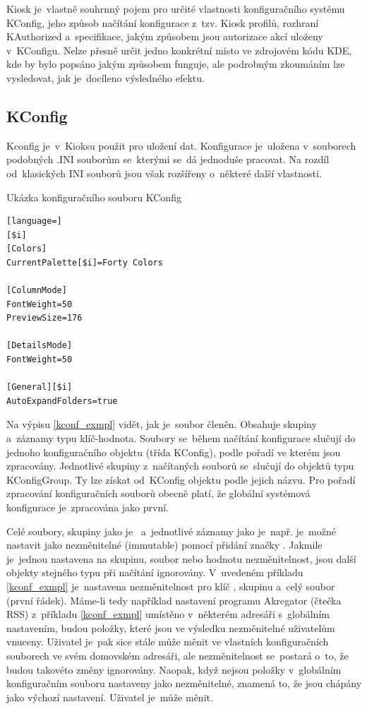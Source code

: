 Kiosk je~vlastně souhrnný pojem pro určité vlastnosti konfiguračního systému KConfig, jeho způsob načítání konfigurace z~tzv. Kiosk profilů, rozhraní KAuthorized a~specifikace, jakým způsobem jsou autorizace akcí uloženy v~KConfigu. Nelze přesně určit jedno konkrétní místo ve zdrojovém kódu KDE, kde by bylo popsáno jakým způsobem funguje, ale podrobným zkoumáním lze vysledovat, jak je~docíleno výsledného efektu.

\subsection*{KConfig}
Kconfig je~v~Kioksu použit pro uložení dat. Konfigurace je~uložena v~souborech podobných .INI souborům se~kterými se~dá jednoduše pracovat. Na rozdíl od~klasických INI souborů jsou však rozšířeny o~některé další vlastnosti.\cite{wikiINIfiles}
\begin{mylisting}
\caption{Ukázka konfiguračního souboru KConfig}
\label{kconf_exmpl}
\begin{lstlisting}[language=]
[$i]
[Colors]
CurrentPalette[$i]=Forty Colors

[ColumnMode]
FontWeight=50
PreviewSize=176

[DetailsMode]
FontWeight=50

[General][$i]
AutoExpandFolders=true
\end{lstlisting}
\end{mylisting}

Na výpisu \ref{kconf_exmpl} vidět, jak je~soubor členěn. Obsahuje skupiny a~záznamy typu klíč-hodnota. Soubory se~během načítání konfigurace slučují do jednoho konfiguračního objektu (třída KConfig), podle pořadí ve kterém jsou zpracovány. Jednotlivé skupiny z~načítaných souborů se~slučují do objektů typu KConfigGroup. Ty lze získat od~KConfig objektu podle jejich názvu. Pro pořadí zpracování konfiguračních souborů obecně platí, že globální systémová konfigurace je~zpracována jako první.

Celé soubory, skupiny jako je~ a~jednotlivé záznamy jako je~např. \linebreak{} je~možné nastavit jako nezměnitelné (immutable) pomocí přidání značky \cppc{[\$i]}. Jakmile je~jednou nastavena na skupinu, soubor nebo hodnotu nezměnitelnost, jsou další objekty stejného typu při načítání ignorovány. V~uvedeném příkladu \ref{kconf_exmpl} je~nastavena nezměnitelnost pro klíč , skupinu  a~celý soubor (první řádek). Máme-li tedy například nastavení programu Akregator (čtečka RSS) z~příkladu \ref{kconf_exmpl} umístěno v~některém adresáři s~globálním nastavením, budou položky, které jsou ve výsledku nezměnitelné uživatelům vnuceny. Uživatel je~pak sice stále může měnit ve vlastních konfiguračních souborech ve svém domovském adresáři, ale nezměnitelnost se~postará o~to, že budou takovéto změny ignorovány. Naopak, když nejsou položky v~globálním konfiguračním souboru nastaveny jako nezměnitelné, znamená to, že jsou chápány jako výchozí nastavení. Uživatel je~může měnit.

